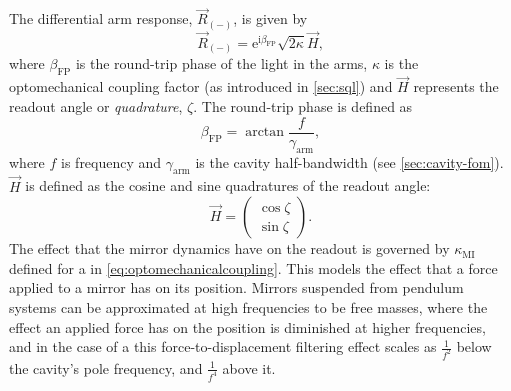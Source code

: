 The differential arm response, $\vec{R}_{\left( - \right)}$, is given by
\begin{equation}
  \label{eq:fp-mich-response}
  \vec{R}_{\left( - \right)} = \text{e}^{\text{i} \beta_{\text{FP}}} \sqrt{2 \kappa} \vec{H},
\end{equation}
where $\beta_{\text{FP}}$ is the round-trip phase of the light in the arms, $\kappa$ is the optomechanical coupling factor (as introduced in \cref{sec:sql}) and $\vec{H}$ represents the readout angle or \emph{quadrature}, $\zeta$. The round-trip phase is defined as
\begin{equation}
  \beta_{\text{FP}} = \arctan{\frac{f}{\gamma_{\text{arm}}}},
\end{equation}
where $f$ is frequency and $\gamma_{\text{arm}}$ is the \FP{} cavity half-bandwidth (see \cref{sec:cavity-fom}). $\vec{H}$ is defined as the cosine and sine quadratures of the readout angle:
\begin{equation}
  \vec{H} =
  \begin{pmatrix}
    \cos \zeta \\
    \sin \zeta
  \end{pmatrix}.
\end{equation}
The effect that the mirror dynamics have on the readout is governed by $\kappa_{\text{MI}}$ defined for a \MI{} in \cref{eq:optomechanicalcoupling}. This models the effect that a force applied to a mirror has on its position. Mirrors suspended from pendulum systems can be approximated at high frequencies to be free masses, where the effect an applied force has on the position is diminished at higher frequencies, and in the case of a \FPMI{} this force-to-displacement filtering effect scales as $\frac{1}{f^2}$ below the cavity's pole frequency, and $\frac{1}{f^4}$ above it.


